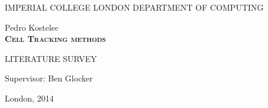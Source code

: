 \documentclass[12pt,a4paper,openany]{book}
\begin{document}
\thispagestyle{empty} 

\begin{center}
{\large 
IMPERIAL COLLEGE LONDON
DEPARTMENT OF COMPUTING\\
}

\vspace{3cm}
{\LARGE Pedro Kostelec}\\

\vspace{2cm}
\textsc{\textbf{\LARGE 
Cell Tracking methods 
}}

\vspace{2cm}
{ LITERATURE SURVEY }

\vspace{2cm} 
{\Large Supervisor: Ben Glocker}

\vfill
{\Large London, 2014}
\end{center}



\thispagestyle{empty}

\newpage




\renewcommand\thepage{} 
\tableofcontents 
\renewcommand\thepage{\arabic{page}}

\thispagestyle{empty}




\newpage


\label{page_bibliography}
 
\end{document}
